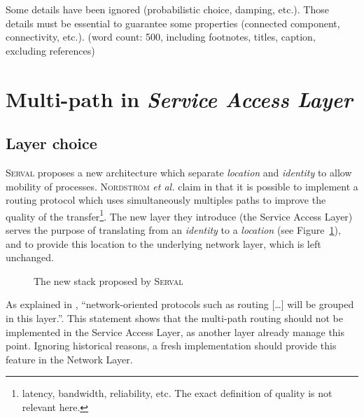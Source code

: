\documentclass[twocolumn]{article}
\begin{document}
Some details have been ignored (probabilistic choice, damping, etc.). Those details must be essential to guarantee some properties (connected component, connectivity, etc.). {\color{gray} (word count: 500, including footnotes, titles, caption, excluding references)}

\section{Multi-path in \emph{Service Access Layer}}
\subsection{Layer choice}
\textsc{Serval} proposes a new architecture which separate \emph{location} and \emph{identity} to allow mobility of processes. \textsc{Nordstr\"om} \emph{et al.} claim in \cite{nordstrom_serval_2012} that it is possible to implement a routing protocol which uses simultaneously multiples paths to improve the quality of the transfer\footnote{latency, bandwidth, reliability, etc. The exact definition of quality is not relevant here.}. The new layer they introduce (the Service Access Layer) serves the purpose of translating from an \emph{identity} to a \emph{location} (see Figure~\ref{fig:Serval_stack}), and to provide this location to the underlying network layer, which is left unchanged.

\begin{figure}[h]
	\begin{drawstack}
		\startframe

		\startframe

		\startframe

		\startframe
	\end{drawstack}
	\caption{The new stack proposed by \textsc{Serval}}
	\label{fig:Serval_stack}
\end{figure}

As explained in \cite{zimmermann_osi_1980}, ``network-oriented protocols such as routing [\ldots] will be grouped in this layer.''. This statement shows that the multi-path routing should not be implemented in the Service Access Layer, as another layer already manage this point. Ignoring historical reasons, a fresh implementation should provide this feature in the Network Layer.
\end{document}

